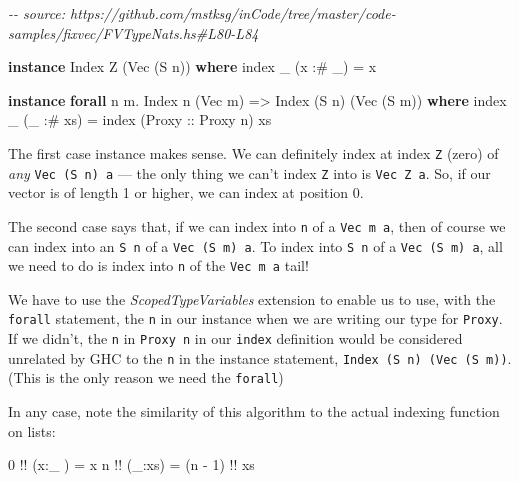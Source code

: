 \documentclass[]{article}
\newenvironment{Shaded}{}{}
\newcommand{\CommentTok}[1]{\textcolor[rgb]{0.38,0.63,0.69}{\textit{#1}}}
\newcommand{\DataTypeTok}[1]{\textcolor[rgb]{0.56,0.13,0.00}{#1}}
\newcommand{\DecValTok}[1]{\textcolor[rgb]{0.25,0.63,0.44}{#1}}
\newcommand{\FunctionTok}[1]{\textcolor[rgb]{0.02,0.16,0.49}{#1}}
\newcommand{\KeywordTok}[1]{\textcolor[rgb]{0.00,0.44,0.13}{\textbf{#1}}}
\newcommand{\NormalTok}[1]{#1}
\newcommand{\OperatorTok}[1]{\textcolor[rgb]{0.40,0.40,0.40}{#1}}
\newcommand{\OtherTok}[1]{\textcolor[rgb]{0.00,0.44,0.13}{#1}}
\begin{document}
\begin{Shaded}
\begin{Highlighting}[]
\CommentTok{{-}{-} source: https://github.com/mstksg/inCode/tree/master/code{-}samples/fixvec/FVTypeNats.hs\#L80{-}L84}

\KeywordTok{instance} \DataTypeTok{Index} \DataTypeTok{Z}\NormalTok{ (}\DataTypeTok{Vec}\NormalTok{ (}\DataTypeTok{S}\NormalTok{ n)) }\KeywordTok{where}
    \FunctionTok{index}\NormalTok{ \_ (x }\OperatorTok{:\#}\NormalTok{ \_) }\OtherTok{=}\NormalTok{ x}

\KeywordTok{instance} \KeywordTok{forall}\NormalTok{ n m}\OperatorTok{.} \DataTypeTok{Index}\NormalTok{ n (}\DataTypeTok{Vec}\NormalTok{ m) }\OtherTok{=\textgreater{}} \DataTypeTok{Index}\NormalTok{ (}\DataTypeTok{S}\NormalTok{ n) (}\DataTypeTok{Vec}\NormalTok{ (}\DataTypeTok{S}\NormalTok{ m)) }\KeywordTok{where}
    \FunctionTok{index}\NormalTok{ \_ (\_ }\OperatorTok{:\#}\NormalTok{ xs) }\OtherTok{=} \FunctionTok{index}\NormalTok{ (}\DataTypeTok{Proxy}\OtherTok{ ::} \DataTypeTok{Proxy}\NormalTok{ n) xs}
\end{Highlighting}
\end{Shaded}

The first case instance makes sense. We can definitely index at index \texttt{Z}
(zero) of \emph{any} \texttt{Vec\ (S\ n)\ a} --- the only thing we can't index
\texttt{Z} into is \texttt{Vec\ Z\ a}. So, if our vector is of length 1 or
higher, we can index at position 0.

The second case says that, if we can index into \texttt{n} of a
\texttt{Vec\ m\ a}, then of course we can index into an \texttt{S\ n} of a
\texttt{Vec\ (S\ m)\ a}. To index into \texttt{S\ n} of a
\texttt{Vec\ (S\ m)\ a}, all we need to do is index into \texttt{n} of the
\texttt{Vec\ m\ a} tail!

We have to use the \emph{ScopedTypeVariables} extension to enable us to use,
with the \texttt{forall} statement, the \texttt{n} in our instance when we are
writing our type for \texttt{Proxy}. If we didn't, the \texttt{n} in
\texttt{Proxy\ n} in our \texttt{index} definition would be considered unrelated
by GHC to the \texttt{n} in the instance statement,
\texttt{Index\ (S\ n)\ (Vec\ (S\ m))}. (This is the only reason we need the
\texttt{forall})

In any case, note the similarity of this algorithm to the actual indexing
function on lists:

\begin{Shaded}
\begin{Highlighting}[]
\DecValTok{0} \OperatorTok{!!}\NormalTok{ (x}\OperatorTok{:}\NormalTok{\_ ) }\OtherTok{=}\NormalTok{ x}
\NormalTok{n }\OperatorTok{!!}\NormalTok{ (\_}\OperatorTok{:}\NormalTok{xs) }\OtherTok{=}\NormalTok{ (n }\OperatorTok{{-}} \DecValTok{1}\NormalTok{) }\OperatorTok{!!}\NormalTok{ xs}
\end{Highlighting}
\end{Shaded}
\end{document}
